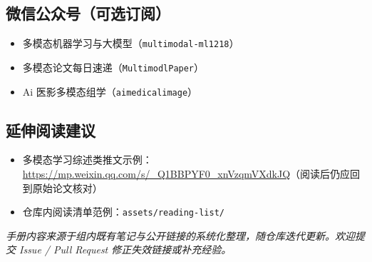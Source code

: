 \subsection{微信公众号（可选订阅）}
\begin{itemize}
  \item 多模态机器学习与大模型（\texttt{multimodal-ml1218}）
  \item 多模态论文每日速递（\texttt{MultimodlPaper}）
  \item Ai 医影多模态组学（\texttt{aimedicalimage}）
\end{itemize}

\subsection{延伸阅读建议}
\begin{itemize}
  \item 多模态学习综述类推文示例：\url{https://mp.weixin.qq.com/s/_Q1BBPYF0_xnVzqmVXdkJQ}（阅读后仍应回到原始论文核对）
  \item 仓库内阅读清单范例：\texttt{assets/reading-list/}
\end{itemize}

\vspace{1em}
\noindent\textit{手册内容来源于组内既有笔记与公开链接的系统化整理，随仓库迭代更新。欢迎提交 Issue / Pull Request 修正失效链接或补充经验。}
